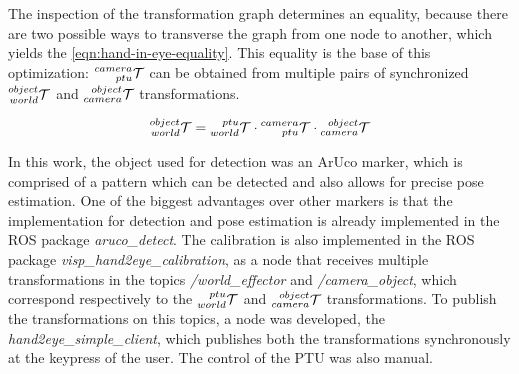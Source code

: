 The inspection of the transformation graph determines an equality, because there are two possible ways to transverse the graph from one node to another, which yields the \cref{eqn:hand-in-eye-equality}. This equality is the base of this optimization: $\TF{ptu}{camera}$ can be obtained from multiple pairs of synchronized $\TF{world}{object}$ and $\TF{camera}{object}$ transformations.

\begin{equation}
    \label{eqn:hand-in-eye-equality}
    \TF{world}{object} = \TF{world}{ptu} \cdot \TF{ptu}{camera} \cdot \TF{camera}{object}
\end{equation}

In this work, the object used for detection was an ArUco marker, which is comprised of a pattern which can be detected and also allows for precise pose estimation. One of the biggest advantages over other markers is that the implementation for detection and pose estimation is already implemented in the ROS package \emph{aruco\_detect}. The calibration is also implemented in the ROS package \emph{visp\_hand2eye\_calibration}, as a node that receives multiple transformations in the topics \emph{/world\_effector} and \emph{/camera\_object}, which correspond respectively to the $\TF{world}{ptu}$ and $\TF{camera}{object}$ transformations. To publish the transformations on this topics, a node was developed, the \emph{hand2eye\_simple\_client}, which publishes both the transformations synchronously at the keypress of the user. The control of the PTU was also manual. 